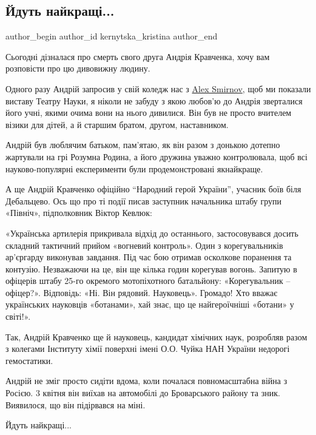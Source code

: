  
 
 
 
 
 
\subsection{Йдуть найкращі...}
\label{sec:15_04_2022.fb.kernytska_kristina.1.jdyt_najkraschi}
 
\ifcmt
 author_begin
   author_id kernytska_kristina
 author_end
\fi

Сьогодні дізналася про смерть свого друга Андрія Кравченка, хочу вам розповісти
про цю дивовижну людину.

Одного разу Андрій запросив у свій коледж нас з
\href{https://www.facebook.com/alex.smirnov.5201}{Alex Smirnov}, щоб ми
показали виставу Театру Науки, я ніколи не забуду з якою любов'ю до Андрія
зверталися його учні, якими очима вони на нього дивилися. Він був не просто
вчителем візики для дітей, а й старшим братом, другом, наставником.


Андрій був люблячим батьком, пам'ятаю, як він разом з донькою дотепно жартували
на грі Розумна Родина, а його дружина уважно контролювала, щоб всі
науково-популярні експерименти були продемонстровані якнайкраще.

А ще Андрій Кравченко офіційно \enquote{Народний герой України}, учасник боїв біля
Дебальцево. Ось що про ті події писав заступник начальника штабу групи
«Північ», підполковник Віктор Кевлюк:

«Українська артилерія прикривала відхід до останнього, застосовувався досить
складний тактичний прийом «вогневий контроль». Один з корегувальників
ар’єргарду виконував завдання. Під час бою отримав осколкове поранення та
контузію. Незважаючи на це, він ще кілька годин корегував вогонь. Запитую в
офіцерів штабу 25-го окремого мотопіхотного батальйону: «Корегувальник –
офіцер?». Відповідь: «Ні. Він рядовий. Науковець». Громадо! Хто вважає
українських науковців «ботанами», хай знає, що це найгероїчніші «ботани» у
світі!».


Так, Андрій Кравченко ще й науковець, кандидат хімічних наук, розробляв разом з
колегами Інституту хімії поверхні імені О.О. Чуйка НАН України недорогі
гемостатики.

Андрій не зміг просто сидіти вдома, коли почалася повномасштабна війна з
Росією. 3 квітня він виїхав на автомобілі до Броварського району та зник.
Виявилося, що він підірвався на міні. 

Йдуть найкращі...

